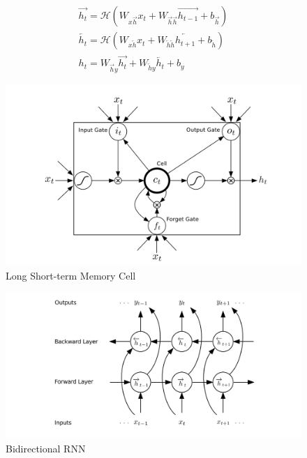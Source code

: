 \documentclass[
  a4paper,
]{article}
\begin{document}
\begin{align}
\overrightarrow{h_t} = \mathcal{H}(W_{x\overrightarrow{h}} x_t + W_{\overrightarrow{h}\overrightarrow{h}} \overrightarrow{h_{t-1}} + b_{\overrightarrow{h}})\\
\overleftarrow{h_t} = \mathcal{H}(W_{x\overleftarrow{h}} x_t + W_{\overleftarrow{h}\overleftarrow{h}} \overleftarrow{h_{t+1}} + b_{\overleftarrow{h}})\\
h_t = W_{\overrightarrow{h}y} \overrightarrow{h_t} + W_{\overleftarrow{h} y} \overleftarrow{h_t} + b_y
\end{align}

\begin{figure}

{\centering \includegraphics{lstm} 

}

\caption{Long Short-term Memory Cell}\label{fig:lstm}
\end{figure}

\begin{figure}

{\centering \includegraphics{rnn} 

}

\caption{Bidirectional RNN}\label{fig:rnn}
\end{figure}
\end{document}
